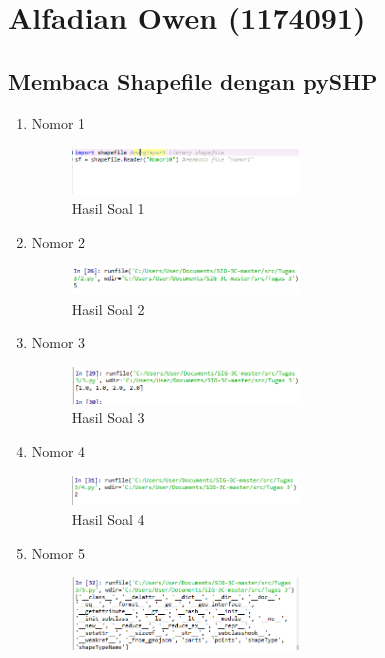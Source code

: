 \section{Alfadian Owen (1174091)}
\subsection{Membaca Shapefile dengan pySHP}
\begin{enumerate}
	\item Nomor 1
	
	\begin{figure}[H]
		\includegraphics[width=6cm]{figures/Tugas3/1174091/1.png}
		\centering
		\caption{Hasil Soal 1}
	\end{figure}
	\item Nomor 2
	
	\begin{figure}[H]
		\includegraphics[width=6cm]{figures/Tugas3/1174091/2.png}
		\centering
		\caption{Hasil Soal 2}
	\end{figure}
	\item Nomor 3
	
	\begin{figure}[H]
		\includegraphics[width=6cm]{figures/Tugas3/1174091/3.png}
		\centering
		\caption{Hasil Soal 3}
	\end{figure}
	\item Nomor 4
	
	\begin{figure}[H]
		\includegraphics[width=6cm]{figures/Tugas3/1174091/4.png}
		\centering
		\caption{Hasil Soal 4}
	\end{figure}
	\item Nomor 5
	
	\begin{figure}[H]
		\includegraphics[width=6cm]{figures/Tugas3/1174091/5.png}

\end{figure}
\end{enumerate}

